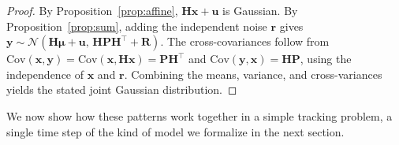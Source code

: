 \begin{proof}
By Proposition~\ref{prop:affine}, $\mathbf{H}\mathbf{x} + \mathbf{u}$ is Gaussian. By Proposition~\ref{prop:sum}, adding the independent noise $\mathbf{r}$ gives $\mathbf{y} \sim \mathcal{N}(\mathbf{H}\boldsymbol{\mu}+\mathbf{u},\, \mathbf{H}\mathbf{P}\mathbf{H}^\top + \mathbf{R})$.
The cross-covariances follow from $\mathrm{Cov}(\mathbf{x}, \mathbf{y}) = \mathrm{Cov}(\mathbf{x}, \mathbf{H}\mathbf{x}) = \mathbf{P}\mathbf{H}^\top$ and $\mathrm{Cov}(\mathbf{y},\mathbf{x})=\mathbf{H}\mathbf{P}$, using the independence of $\mathbf{x}$ and $\mathbf{r}$. Combining the means, variance, and cross-variances yields the stated joint Gaussian distribution. 
\end{proof}


We now show how these patterns work together in a simple tracking problem, a single time step of the kind of model we formalize in the next section.

